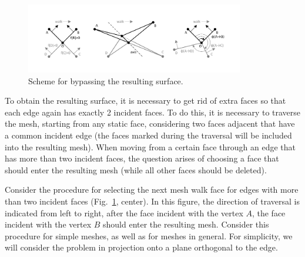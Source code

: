 \documentclass[
11pt,
tightenlines,
twoside,
onecolumn,
nofloats,
nobibnotes,
nofootinbib,
superscriptaddress,
noshowpacs,
centertags]
{revtex4-2}
\begin{document}
\begin{figure}[h]
\includegraphics[width=0.85\textwidth]{pics/pic_walk_1_size.pdf}
\caption{Scheme for bypassing the resulting surface.}\label{fig:pic_walk}
\end{figure}

To obtain the resulting surface, it is necessary to get rid of extra faces so that each edge again has exactly 2 incident faces.
To do this, it is necessary to traverse the mesh, starting from any static face, considering two faces adjacent that have a common incident edge (the faces marked during the traversal will be included into the resulting mesh).
When moving from a certain face through an edge that has more than two incident faces, the question arises of choosing a face that should enter the resulting mesh (while all other faces should be deleted).

Consider the procedure for selecting the next mesh walk face for edges with more than two incident faces (Fig.~\ref{fig:pic_walk}, center).
In this figure, the direction of traversal is indicated from left to right, after the face incident with the vertex $A$, the face incident with the vertex $B$ should enter the resulting mesh.
Consider this procedure for simple meshes, as well as for meshes in general.
For simplicity, we will consider the problem in projection onto a plane orthogonal to the edge.
\end{document}
